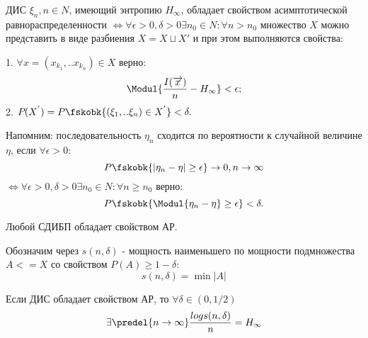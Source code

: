 \begin{proofs}
ДИС ${\xi_n, n \in N}$, имеющий энтропию $H_{\infty}$, обладает свойством асимптотической равнораспределенности $\Leftrightarrow \forall \epsilon > 0, \delta > 0 \exists n_0 \in N: \forall n > n_0$ множество $X$ можно представить в виде разбиения $X = X \sqcup X'$ и при этом выполняются свойства:

1. $\forall x=(x_{k_1},..x_{k_n}) \in X$ верно:
$$\Modul{\frac{I(\overrightarrow{x})}{n} - H_{\infty}} < \epsilon;$$
2. $P_{}(X^{'}) = P \fskobk{(\xi_1,..\xi_n) \in X^{'}} < \delta.$

  \begin{dokvo}
  Напомним: последовательность $\eta_n$ сходится по вероятности к случайной величине $\eta$, если $\forall \epsilon > 0:$
  $$P \fskobk{|\eta_n - \eta| \geq \epsilon} \rightarrow 0, n \rightarrow \infty$$ 
  $\Leftrightarrow \forall \epsilon > 0, \delta > 0 \exists n_0 \in N: \forall n \geq n_0 $ верно:
  $$P \fskobk{\Modul{\eta_n - \eta} \geq \epsilon} < \delta.$$
  \end{dokvo} 

\end{proofs} 

\begin{proofs}[1-я т. Шеннона]
Любой СДИБП обладает свойством АР.
\end{proofs}

\begin{defs}
Обозначим через $s(n, \delta)$ - мощность наименьшего по мощности подмножества $A <=  X$ со свойством $P(A) \geq 1-\delta:$
$$s(n,\delta) = \min|A|$$ 
\end{defs}

\begin{proofs}[2-я т. Шеннона]
Если ДИС обладает свойством АР, то $\forall \delta \in (0, 1/2) $
$$\exists \predel{n \rightarrow \infty} \frac{log s(n, \delta)} {n} = H_{\infty}$$
\end{proofs}

\newpage
